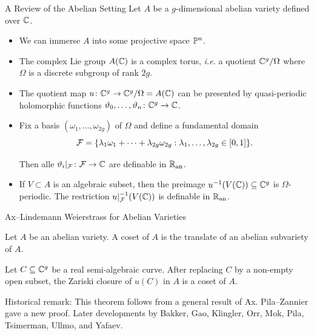 \documentclass{beamer}
\begin{document}
\begin{frame}{A Review of the Abelian Setting}
  Let $A$ be a $g$-dimensional abelian variety defined over ${\mathbb{C}}$.
  \begin{itemize}
  \item We can immerse $A$ into some projective space ${\mathbb{P}}^n$.

  \item The complex Lie group $A({\mathbb{C}})$ is a complex torus, \textit{i.e.} a
    quotient ${\mathbb{C}}^g/\Omega$ where $\Omega$ is a discrete subgroup of
    rank $2g$.

  \item The quotient map $u\colon {\mathbb{C}}^g\rightarrow {\mathbb{C}}^g/\Omega
    =A({\mathbb{C}})$ can be presented by quasi-periodic holomorphic functions
    $\vartheta_0,\ldots,\vartheta_n \colon {\mathbb{C}}^g\rightarrow{\mathbb{C}}$.

  \item Fix a basis $(\omega_1,\ldots,\omega_{2g})$ of $\Omega$ and
    define a fundamental domain 
    $${\mathcal F} = \{\lambda_1\omega_1+\cdots+\lambda_{2g}\omega_{2g} :
    \lambda_1,\ldots,\lambda_{2g} \in [0,1]\}.$$

    Then alle $\vartheta_i|_{{\mathcal F}}\colon {\mathcal F}\rightarrow{\mathbb{C}}$ are
    definable in ${{\mathbb{R}}_{\mathrm{an}}}$.

  \item If $V\subset A$ is an algebraic subset, then the preimage
    $u^{-1}(V({\mathbb{C}})) \subseteq{\mathbb{C}}^g$ is $\Omega$-periodic.
    The restriction $u|_{{\mathcal F}}^{-1}(V({\mathbb{C}}))$ is definable in ${{\mathbb{R}}_{\mathrm{an}}}$.
  \end{itemize}
\end{frame}

\begin{frame}{Ax--Lindemann Weierstrass for Abelian Varieties}
  \begin{definition}
    Let $A$ be an abelian variety. A \alert{coset} of $A$ is the translate of an
    abelian subvariety of $A$. 
  \end{definition}

  \begin{theorem}
    Let $C\subseteq{\mathbb{C}}^g$ be a real semi-algebraic curve. After replacing
    $C$ by a non-empty open subset, the Zariski
    closure of $u(C)$ in $A$ is a coset of $A$.
  \end{theorem}

  Historical remark: This theorem follows from a general result of Ax.
  Pila--Zannier gave a new proof. Later developments by Bakker, Gao, Klingler,
  Orr, Mok, Pila,
  Tsimerman, Ullmo, and Yafaev.
\end{frame}
\end{document}
